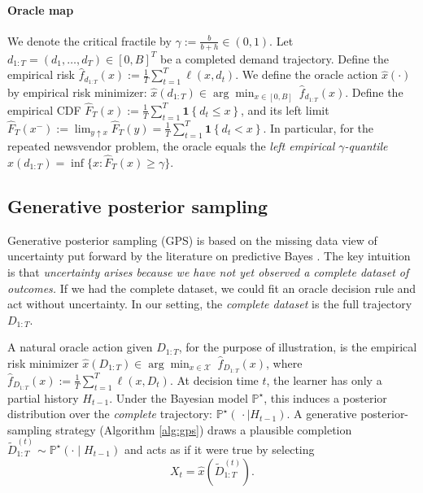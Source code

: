 \documentclass[11pt]{article}
\DeclarePairedDelimiter{\ind}{\mathbf{1}\{}{\}}
\renewcommand{\P}{\mathbb{P}}
\providecommand{\ind}[1]{\mathbf{1}\!\left\{#1\right\}}
\providecommand{\cX}{\mathcal{X}}
\begin{document}
\paragraph{Oracle map}
We denote the critical fractile by $\gamma:=\frac{b}{b+h}\in(0,1)$. Let $d_{1:T}=(d_1,\dots,d_T)\in [0, B]^T$ be a completed demand trajectory. Define the empirical risk $\widehat f_{d_{1:T}}(x)
:= \frac1T \sum_{t=1}^T \ell(x,d_t)$. We define the oracle action $\hat x(\cdot)$ by empirical risk minimizer: $\hat x(d_{1:T}) \in \arg\min_{x\in[0,B]}\ \widehat f_{d_{1:T}}(x)$. Define the empirical CDF $\widehat F_T(x) := \frac1T \sum_{t=1}^T \ind{ d_t \le x}$, and its left limit $\widehat F_T(x^-):=\lim_{y\uparrow x}\widehat F_T(y)
=\frac1T\sum_{t=1}^T \ind{ d_t < x}$. In particular, for the repeated newsvendor problem, the oracle equals the \emph{left empirical $\gamma$-quantile} $\hat x(d_{1:T}) = \inf\{x: \widehat F_T(x)\ge \gamma\}$.
















\subsection{Generative posterior sampling}
\label{subsec:missingdata}

Generative posterior sampling (GPS) is based on the missing data view of uncertainty put forward by the literature on predictive Bayes \citep{Shen2024PredictionCentricUQ, shirvaikar2024general,cai2024active,zhang2025contextual}. The key intuition is that \emph{uncertainty arises because we have not yet observed a complete dataset of outcomes.} If we had the complete dataset, we could fit an oracle decision rule and act without uncertainty. In our setting, the \emph{complete dataset} is the full trajectory $D_{1:T}$. 

A natural oracle action given $D_{1:T}$, for the purpose of illustration, is the empirical risk minimizer $\hat x(D_{1:T}) \in \arg\min_{x\in\cX}\; \hat f_{D_{1:T}}(x)$, where $\hat f_{D_{1:T}}(x) := \frac1T \sum_{t=1}^T \ell(x,D_t)$. At decision time $t$, the learner has only a partial history $H_{t-1}$. Under the Bayesian model $\P^\star$, this induces a posterior distribution over the \emph{complete} trajectory:
\(
\P^\star(\,\cdot\mid H_{t-1}).
\)
A generative posterior-sampling strategy (Algorithm \ref{alg:gps}) draws a plausible completion
$\widetilde D_{1:T}^{(t)} \sim \P^\star(\cdot\mid H_{t-1})$ and acts as if it were true by selecting
\begin{equation}
\label{eq:ideal-ps}
X_t = \hat x(\widetilde D_{1:T}^{(t)}).
\end{equation}
\end{document}
